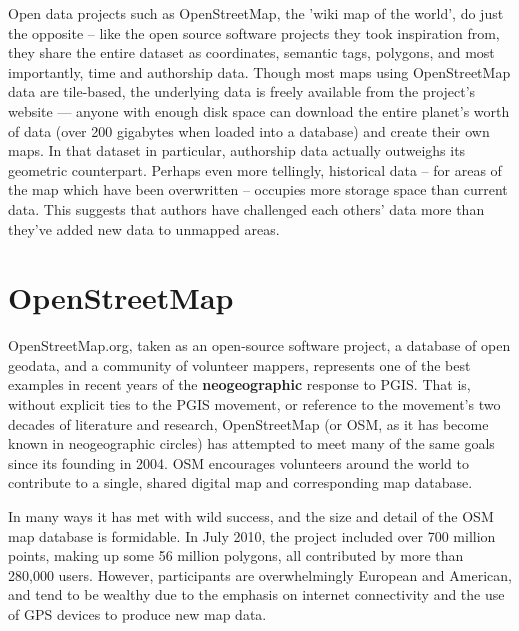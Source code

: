 \documentclass[11pt,oneside,notitlepage]{report}
\begin{document}
Open data projects such as OpenStreetMap, the 'wiki map of the world', do just the opposite – like the open source software projects they took inspiration from, they share the entire dataset as coordinates, semantic tags, polygons, and most importantly, time and authorship data. Though most maps using OpenStreetMap data are tile-based, the underlying data is freely available from the project's website --- anyone with enough disk space can download the entire planet's worth of data (over 200 gigabytes when loaded into a database) and create their own maps. In that dataset in particular, authorship data actually outweighs its geometric counterpart. Perhaps even more tellingly, historical data – for areas of the map which have been overwritten – occupies more storage space than current data. This suggests that authors have challenged each others' data more than they've added new data to unmapped areas. \cite{warren2009composition}
  
\section{OpenStreetMap}
\label{sec:openstreetmap}

OpenStreetMap.org, taken as an open-source software project, a database of open geodata, and a community of volunteer mappers, represents one of the best examples in recent years of the \textbf{neogeographic} response to \ac{PGIS}. That is, without explicit ties to the \ac{PGIS} movement, or reference to the movement's two decades of literature and research, OpenStreetMap (or OSM, as it has become known in neogeographic circles) has attempted to meet many of the same goals since its founding in 2004. OSM encourages volunteers around the world to contribute to a single, shared digital map and corresponding map database. \cite{chilton-crowdsourcing} 

In many ways it has met with wild success, and the size and detail of the OSM map database is formidable. In July 2010, the project included over 700 million points, making up some 56 million polygons, all contributed by more than 280,000 users. \cite{osm2010stats} However, participants are overwhelmingly European and American, and tend to be wealthy due to the emphasis on internet connectivity and the use of GPS devices to produce new map data.
\end{document}
